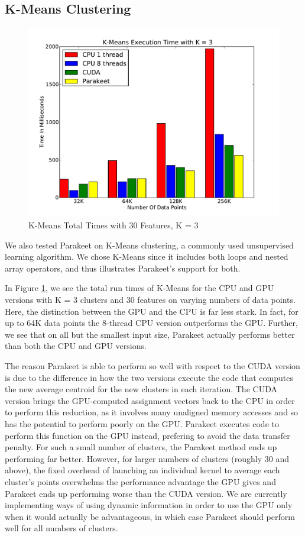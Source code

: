 \documentclass[10pt,twocolumn]{article}
\begin{document}
\subsection{K-Means Clustering}
\label{results-k-means}

\begin{figure}
\includegraphics[scale=0.4]{KMCPUK3.pdf}
\caption{K-Means Total Times with 30 Features, K = 3}
\label{KMCPU3}
\end{figure}

We also tested Parakeet on K-Means clustering, a commonly used unsupervised learning algorithm.  We chose K-Means since it includes both loops and nested array operators, and thus illustrates Parakeet's support for both.

In Figure \ref{KMCPU3}, we see the total run times of K-Means for the CPU and GPU versions with K = 3 clusters and 30 features on varying numbers of data points.  Here, the distinction between the GPU and the CPU is far less stark.  In fact, for up to 64K data points the 8-thread CPU version outperforms the GPU.  Further, we see that on all but the smallest input size, Parakeet actually performs better than both the CPU and GPU versions.

The reason Parakeet is able to perform so well with respect to the CUDA version is due to the difference in how the two versions execute the code that computes the new average centroid for the new clusters in each iteration.  The CUDA version brings the GPU-computed assignment vectors back to the CPU in order to perform this reduction, as it involves many unaligned memory accesses and so has the potential to perform poorly on the GPU.  Parakeet executes code to perform this function on the GPU instead, prefering to avoid the data transfer penalty.  For such a small number of clusters, the Parakeet method ends up performing far better.  However, for larger numbers of clusters (roughly 30 and above), the fixed overhead of launching an individual kernel to average each cluster's points overwhelms the performance advantage the GPU gives and Parakeet ends up performing worse than the CUDA version.  We are currently implementing ways of using dynamic information in order to use the GPU only when it would actually be advantageous, in which case Parakeet should perform well for all numbers of clusters.
\end{document}

